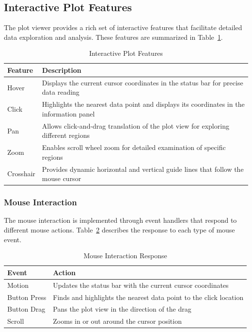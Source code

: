 \documentclass[11pt,a4paper]{article}
\begin{document}
\subsection{Interactive Plot Features}

The plot viewer provides a rich set of interactive features that facilitate detailed data exploration and analysis. These features are summarized in Table~\ref{tab:interactive_features}.

\begin{table}[h]
\centering
\caption{Interactive Plot Features}\label{tab:interactive_features}
\begin{tabular}{p{4cm}p{10cm}}
\toprule
\textbf{Feature} & \textbf{Description} \\
\midrule
Hover & Displays the current cursor coordinates in the status bar for precise data reading \\
Click & Highlights the nearest data point and displays its coordinates in the information panel \\
Pan & Allows click-and-drag translation of the plot view for exploring different regions \\
Zoom & Enables scroll wheel zoom for detailed examination of specific regions \\
Crosshair & Provides dynamic horizontal and vertical guide lines that follow the mouse cursor \\
\bottomrule
\end{tabular}
\end{table}

\subsubsection{Mouse Interaction}

The mouse interaction is implemented through event handlers that respond to different mouse actions. Table~\ref{tab:mouse_interaction} describes the response to each type of mouse event.

\begin{table}[h]
\centering
\caption{Mouse Interaction Response}\label{tab:mouse_interaction}
\begin{tabular}{p{4cm}p{10cm}}
\toprule
\textbf{Event} & \textbf{Action} \\
\midrule
Motion & Updates the status bar with the current cursor coordinates \\
Button Press & Finds and highlights the nearest data point to the click location \\
Button Drag & Pans the plot view in the direction of the drag \\
Scroll & Zooms in or out around the cursor position \\
\bottomrule
\end{tabular}
\end{table}
\end{document}
